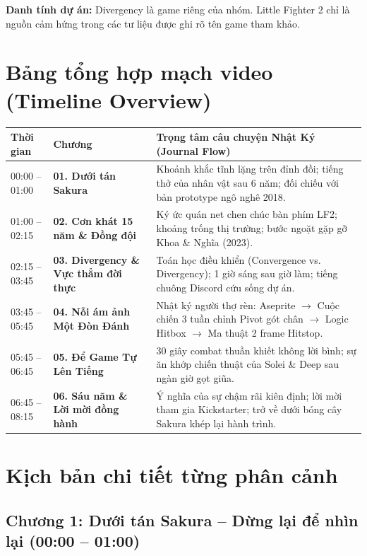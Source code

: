 \documentclass[11pt,a4paper]{article}
\begin{document}
\textbf{Danh tính dự án:} Divergency là game riêng của nhóm. Little Fighter 2 chỉ là nguồn cảm hứng trong các tư liệu được ghi rõ tên game tham khảo.\par

\tableofcontents

\newpage
\section{Bảng tổng hợp mạch video (Timeline Overview)}

\begin{longtable}{@{}p{}p{}p{}@{}}
\toprule
\textbf{Thời gian} & \textbf{Chương} & \textbf{Trọng tâm câu chuyện Nhật Ký (Journal Flow)} \\
\midrule
\endhead
00:00 -- 01:00 & \textbf{01. Dưới tán Sakura} & Khoảnh khắc tĩnh lặng trên đỉnh đồi; tiếng thở của nhân vật sau 6 năm; đối chiếu với bản prototype ngô nghê 2018. \\
01:00 -- 02:15 & \textbf{02. Cơn khát 15 năm \& Đồng đội} & Ký ức quán net chen chúc bàn phím LF2; khoảng trống thị trường; bước ngoặt gặp gỡ Khoa \& Nghĩa (2023). \\
02:15 -- 03:45 & \textbf{03. Divergency \& Vực thẳm đời thực} & Toán học điều khiển (Convergence vs. Divergency); 1 giờ sáng sau giờ làm; tiếng chuông Discord cứu sống dự án. \\
03:45 -- 05:45 & \textbf{04. Nỗi ám ảnh Một Đòn Đánh} & Nhật ký người thợ rèn: Aseprite $\rightarrow$ Cuộc chiến 3 tuần chỉnh Pivot gót chân $\rightarrow$ Logic Hitbox $\rightarrow$ Ma thuật 2 frame Hitstop. \\
05:45 -- 06:45 & \textbf{05. Để Game Tự Lên Tiếng} & 30 giây combat thuần khiết không lời bình; sự ăn khớp chiến thuật của Solei \& Deep sau ngàn giờ gọt giũa. \\
06:45 -- 08:15 & \textbf{06. Sáu năm \& Lời mời đồng hành} & Ý nghĩa của sự chậm rãi kiên định; lời mời tham gia Kickstarter; trở về dưới bóng cây Sakura khép lại hành trình. \\
\bottomrule
\end{longtable}

\newpage
\section{Kịch bản chi tiết từng phân cảnh}

\subsection*{Chương 1: Dưới tán Sakura -- Dừng lại để nhìn lại (00:00 -- 01:00)}
\end{document}
